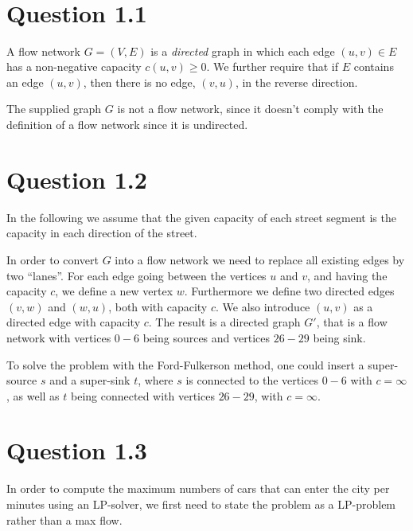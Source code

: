 \documentclass[10pt]{article}
\author{\authorName \\\texttt{\small{\authorEmail}}}
\title{\textsc{\titleName \\ \courseName}}
\begin{document}
\maketitle    

\section*{Question 1.1} %
\label{sec:question_1_1}

A flow network $G = (V,E)$ is a \emph{directed} graph in which each edge $(u,v) \in E$ has a non-negative capacity $c(u,v)\geq 0$. We further require that if $E$ contains an edge $(u,v)$, then there is no edge, $(v,u)$, in the reverse direction\cite{Cormen}.

The supplied graph $G$ is not a flow network, since it doesn't comply with the definition of a flow network since it is undirected. 


\section*{Question 1.2} %
\label{sec:question_1_2}

In the following we assume that the given capacity of each street segment is the capacity in each direction of the street. 

In order to convert $G$ into a flow network we need to replace all existing edges by two ``lanes''. For each edge going between the vertices $u$ and $v$, and having the capacity $c$, we define a new vertex $w$. Furthermore we define two directed edges $(v,w)$ and $(w,u)$, both with capacity $c$. We also introduce $(u,v)$ as a directed edge with capacity $c$. The result is a directed graph $G'$, that is a flow network with vertices $0-6$ being sources and vertices $26-29$ being sink.

To solve the problem with the Ford-Fulkerson method, one could insert a super-source $s$ and a super-sink $t$, where $s$ is connected to the vertices $0-6$ with $c = \infty$, as well as $t$ being connected with vertices $26-29$, with $c = \infty$.

\section*{Question 1.3} %
\label{sec:question_1_3}
In order to compute the maximum numbers of cars that can enter the city per minutes using an LP-solver, we first need to state the problem as a LP-problem rather than a max flow.
\end{document}
